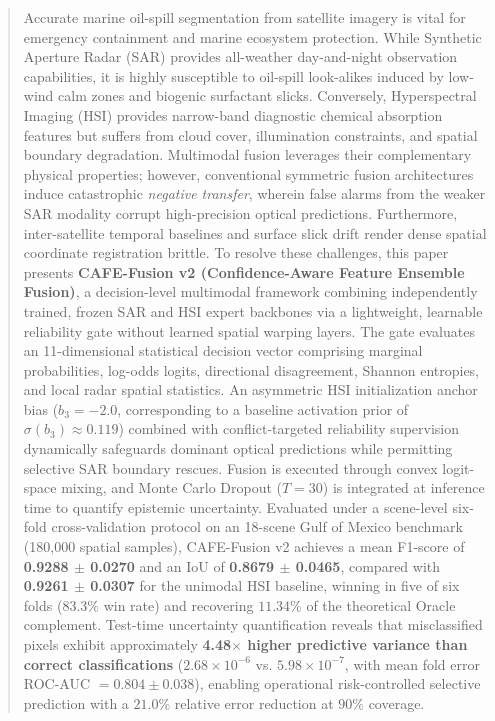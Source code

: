 \documentclass[conference]{IEEEtran}
\begin{document}
\begin{abstract}
Accurate marine oil-spill segmentation from satellite imagery is vital for emergency containment and marine ecosystem protection. While Synthetic Aperture Radar (SAR) provides all-weather day-and-night observation capabilities, it is highly susceptible to oil-spill look-alikes induced by low-wind calm zones and biogenic surfactant slicks. Conversely, Hyperspectral Imaging (HSI) provides narrow-band diagnostic chemical absorption features but suffers from cloud cover, illumination constraints, and spatial boundary degradation. Multimodal fusion leverages their complementary physical properties; however, conventional symmetric fusion architectures induce catastrophic \textit{negative transfer}, wherein false alarms from the weaker SAR modality corrupt high-precision optical predictions. Furthermore, inter-satellite temporal baselines and surface slick drift render dense spatial coordinate registration brittle. To resolve these challenges, this paper presents \textbf{CAFE-Fusion v2 (Confidence-Aware Feature Ensemble Fusion)}, a decision-level multimodal framework combining independently trained, frozen SAR and HSI expert backbones via a lightweight, learnable reliability gate without learned spatial warping layers. The gate evaluates an 11-dimensional statistical decision vector comprising marginal probabilities, log-odds logits, directional disagreement, Shannon entropies, and local radar spatial statistics. An asymmetric HSI initialization anchor bias ($b_3 = -2.0$, corresponding to a baseline activation prior of $\sigma(b_3) \approx 0.119$) combined with conflict-targeted reliability supervision dynamically safeguards dominant optical predictions while permitting selective SAR boundary rescues. Fusion is executed through convex logit-space mixing, and Monte Carlo Dropout ($T=30$) is integrated at inference time to quantify epistemic uncertainty. Evaluated under a scene-level six-fold cross-validation protocol on an 18-scene Gulf of Mexico benchmark (180,000 spatial samples), CAFE-Fusion v2 achieves a mean F1-score of \textbf{0.9288 $\pm$ 0.0270} and an IoU of \textbf{0.8679 $\pm$ 0.0465}, compared with \textbf{0.9261 $\pm$ 0.0307} for the unimodal HSI baseline, winning in five of six folds ($83.3\%$ win rate) and recovering $11.34\%$ of the theoretical Oracle complement. Test-time uncertainty quantification reveals that misclassified pixels exhibit approximately \textbf{4.48$\times$ higher predictive variance than correct classifications} ($2.68\times 10^{-6}$ vs. $5.98\times 10^{-7}$, with mean fold error ROC-AUC $= 0.804 \pm 0.038$), enabling operational risk-controlled selective prediction with a $21.0\%$ relative error reduction at $90\%$ coverage.
\end{abstract}
\end{document}
